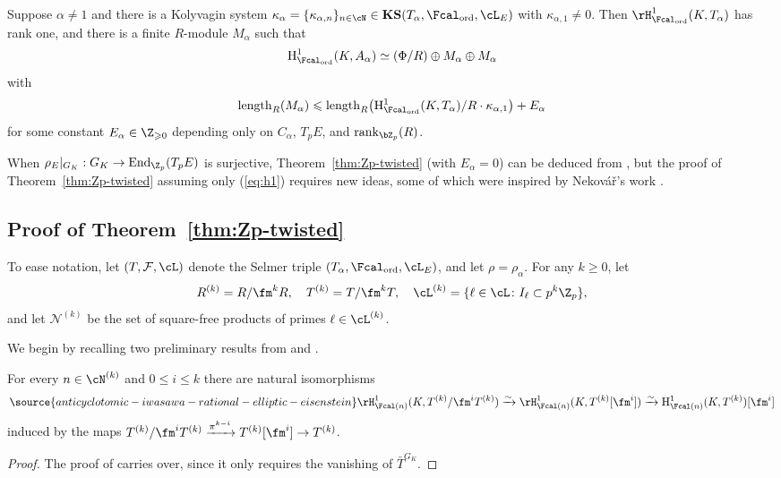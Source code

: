 \begin{theorem}
\notready\label{thm:Zp-twisted}
Suppose $\alpha\neq 1$ and there is a Kolyvagin system $\kappa_\alpha=\{\kappa_{\alpha,n}\}_{n\in\cN}\in\mathbf{KS}(T_\alpha,\Fcal_{\rm ord},\cL_E)$ with $\kappa_{\alpha,1}\neq 0$. Then $\rH^1_{\Fcal_{\rm ord}}(K,T_\alpha)$ has rank one, and there is a finite $R$-module $M_\alpha$ such that
\[
{\rm H}^1_{\Fcal_{\rm ord}}(K,A_\alpha)\simeq(\Phi/R)\oplus M_\alpha\oplus M_\alpha
\]
with
\[
{\rm length}_R(M_\alpha)\leqslant {\rm length}_R\bigl({\rm H}^1_{\Fcal_{\rm ord}}(K,T_\alpha)/R\cdot\kappa_{\alpha,1}\bigr)+E_\alpha
\]
for some constant $E_\alpha\in\Z_{\geqslant 0}$ depending only on  $C_{\alpha}$, $T_pE$, and ${\rm rank}_{\bZ_p}(R)$.
\end{theorem}

When $\rho_E\vert_{G_K}:G_K\rightarrow{\rm End}_{\Z_p}(T_pE)$ is surjective, Theorem~\ref{thm:Zp-twisted} (with $E_\alpha=0$) can be deduced from \cite[Thm.~1.6.1]{howard}, but the proof of Theorem~\ref{thm:Zp-twisted} assuming only (\ref{eq:h1}) requires new ideas, some of which were inspired by Nekov\'{a}\v{r}'s work \cite{nekovar}.



\subsection{Proof of Theorem~\ref{thm:Zp-twisted}}

To ease notation, let $(T,\mathcal{F},\cL)$ denote the Selmer triple $(T_\alpha,\Fcal_{\rm ord},\cL_E)$, and let $\rho=\rho_\alpha$. For any $k\geqslant 0$, let
\[
R^{(k)}=R/\fm^kR,\quad T^{(k)}=T/\fm^kT,\quad\cL^{(k)}=\{\ell\in\cL\colon I_\ell\subset p^k\Z_p\},
\]
and let $\mathscr{N}^{(k)}$ be the set of square-free products of primes $\ell\in\cL^{(k)}$.

We begin by recalling two preliminary results from \cite{mazrub} and \cite{howard}.

\begin{lemma}
\notready\label{lemmamod}
For every $n\in\cN^{(k)}$ and $0\leqslant i\leqslant k$ there are natural isomorphisms
\begin{equation}\label{eq2}
\source{anticyclotomic-iwasawa-rational-elliptic-eisenstein}
\rH^1_{\Fcal(n)}(K,T^{(k)}/\fm^iT^{(k)})\xrightarrow{\sim}\rH^1_{\Fcal(n)}(K,T^{(k)}[\fm^i])\xrightarrow{\sim}{\rm H}_{\Fcal(n)}^1(K,T^{(k)})[\fm^i]\nonumber
\end{equation}
induced by the maps $T^{(k)}/\fm^iT^{(k)}\xrightarrow{\pi^{k-i}}T^{(k)}[\fm^i]\rightarrow T^{(k)}$.
\end{lemma}
\begin{proof}
The proof of \cite[Lem.~3.5.4]{mazrub} carries over, since it only requires the vanishing of $\bar{T}^{G_K}$.
\end{proof}

